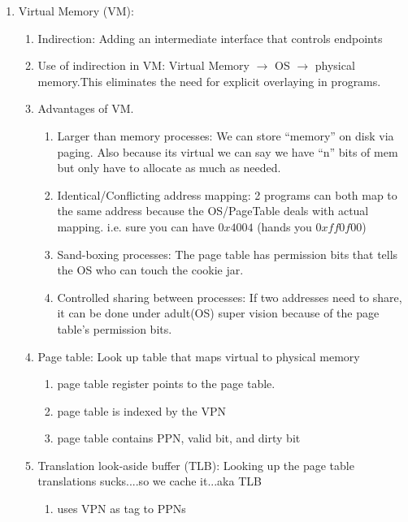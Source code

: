 \documentclass[12pt]{article}
\renewcommand{\=}[1]{\stackrel{#1}{=}} %
\theoremstyle{definition}
\theoremstyle{remark}
\begin{document}
\begin{enumerate}
\begin{enumerate}
    \end{enumerate}

  \item Virtual Memory (VM):
    \begin{enumerate}
    \item Indirection: Adding an intermediate interface that controls endpoints
    \item Use of indirection in VM: Virtual Memory $\rightarrow$ OS
      $\rightarrow$ physical memory.This eliminates the need for
      explicit overlaying in programs.
    \item Advantages of VM.
      \begin{enumerate}
      \item Larger than memory processes: We can store ``memory'' on
        disk via paging. Also because its virtual we can say we have
        ``n'' bits of mem but only have to allocate as much as needed.
      \item Identical/Conflicting address mapping: 2 programs can both
        map to the same address because the OS/PageTable deals with
        actual mapping. i.e. sure you can have $0x4004$ (hands you $0xff0f00$)
      \item Sand-boxing processes: The page table has permission bits
        that tells the OS who can touch the cookie jar.
      \item Controlled sharing between processes: If two addresses
        need to share, it can be done under adult(OS) super vision
        because of the page table's permission bits.
      \end{enumerate}
    \item Page table: Look up table that maps virtual to physical memory
      \begin{enumerate}
      \item page table register points to the page table.
      \item page table is indexed by the VPN
      \item page table contains PPN, valid bit, and dirty bit
      \end{enumerate}

    \item Translation look-aside buffer (TLB): Looking up the page
      table translations sucks....so we cache it...aka TLB
      \begin{enumerate}
      \item uses VPN as tag to PPNs
      \end{enumerate}


\end{enumerate}
\end{enumerate}
\end{document}
